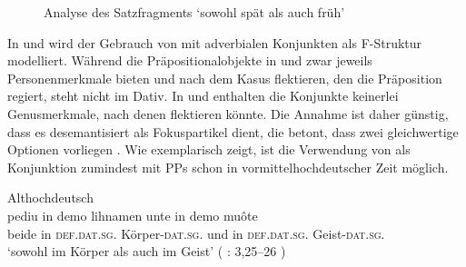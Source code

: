 \begin{exe}
\begin{xlist}
		\begin{figure}
		\caption{Analyse des Satzfragments  `sowohl spät als auch früh'}
		\label{fig:syntintvar1_2}
		\end{figure}
	\end{xlist}
\end{exe}

In  und 
wird der Gebrauch von  mit adverbialen Konjunkten als F-Struktur
modelliert. Während die Präpositionalobjekte in  und
 zwar jeweils Personenmerkmale bieten und nach dem
Kasus flektieren, den die Präposition regiert, steht  nicht im
Dativ. In  und  enthalten die
Konjunkte keinerlei Genusmerkmale, nach denen  flektieren könnte.
Die Annahme ist daher günstig, dass es desemantisiert als Fokuspartikel dient,
die betont, dass zwei gleichwertige Optionen vorliegen
\autocite[425--428]{johannessen2005}. Wie 
exemplarisch zeigt, ist die Verwendung von  als Konjunktion
zumindest mit PPs schon in vormittelhochdeutscher Zeit
möglich.

\begin{exe}
\ex \label{ex:beideintiahd_3_copy}
	\langinfo%
		{Althochdeutsch}
		{}
		{\cite[171]{steinmeyer1916}}\\
	\gll pediu in demo lihnamen unte in demo muôte \\
		beide in \textsc{def.dat.sg.\MascI} Körper-\textsc{dat.sg.\MascI} und in
			\textsc{def.dat.sg.\MascI} Geist-\textsc{dat.sg.\MascI} \\
	\trans `sowohl im Körper als auch im Geist'
		(%
			: 3,25--26
		)
\end{exe}

